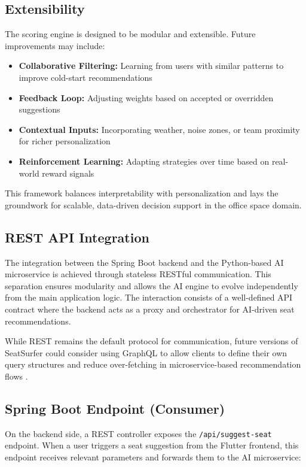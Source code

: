 \documentclass[12pt,a4paper]{report} %
\begin{document}
\subsection*{Extensibility}

The scoring engine is designed to be modular and extensible. Future improvements may include:
\begin{itemize}
\item \textbf{Collaborative Filtering:} Learning from users with similar patterns to improve cold-start recommendations
\item \textbf{Feedback Loop:} Adjusting weights based on accepted or overridden suggestions
\item \textbf{Contextual Inputs:} Incorporating weather, noise zones, or team proximity for richer personalization
\item \textbf{Reinforcement Learning:} Adapting strategies over time based on real-world reward signals
\end{itemize}

This framework balances interpretability with personalization and lays the groundwork for scalable, data-driven decision support in the office space domain.

\subsection{REST API Integration}

The integration between the Spring Boot backend and the Python-based AI microservice is achieved through stateless RESTful communication. This separation ensures modularity and allows the AI engine to evolve independently from the main application logic. The interaction consists of a well-defined API contract where the backend acts as a proxy and orchestrator for AI-driven seat recommendations.

While REST remains the default protocol for communication, future versions of SeatSurfer could consider using GraphQL to allow clients to define their own query structures and reduce over-fetching in microservice-based recommendation flows \cite{wang2022graphql}.

\subsection*{Spring Boot Endpoint (Consumer)}

On the backend side, a REST controller exposes the \texttt{/api/suggest-seat} endpoint. When a user triggers a seat suggestion from the Flutter frontend, this endpoint receives relevant parameters and forwards them to the AI microservice:
\end{document}
